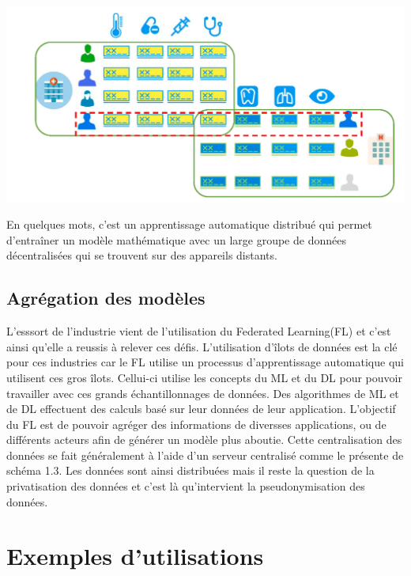 \documentclass[12pt,a4paper]{report}
\begin{document}
\begin{center}
	\includegraphics[scale=0.2]{fl_distribute}
	\label{fig1}
\end{center}

En quelques mots, c'est un apprentissage automatique distribué qui permet d'entraîner un modèle mathématique avec un large groupe de données décentralisées qui se trouvent sur des appareils distants.\\

\section{Agrégation des modèles}




L'esssort de l'industrie vient de l'utilisation du Federated Learning(FL) et c'est ainsi qu'elle a reussis à relever ces défis. L'utilisation d'îlots de données est la clé pour ces industries car le FL utilise un processus d'apprentissage automatique qui utilisent ces gros îlots. Cellui-ci utilise les concepts du ML et du DL pour pouvoir travailler avec ces grands échantillonnages de données. Des algorithmes de ML et de DL effectuent des calculs basé sur leur données de leur application. L'objectif du FL est de pouvoir agréger des informations de diversses applications, ou de différents acteurs afin de générer un modèle plus aboutie. Cette centralisation des données se fait généralement à l'aide d'un serveur centralisé comme le présente de schéma 1.3. Les données sont ainsi distribuées mais il reste la question de la privatisation des données et c'est là qu'intervient la pseudonymisation des données.
 







\chapter{Exemples d'utilisations}
\end{document}
